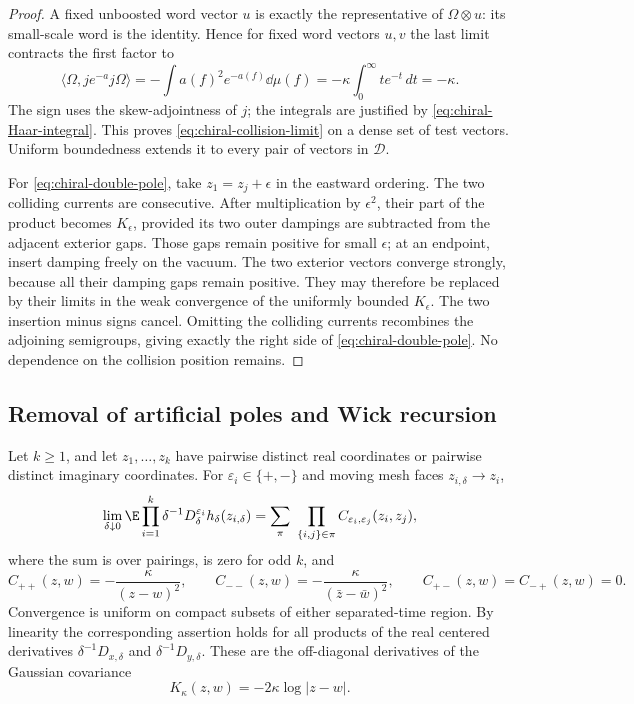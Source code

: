 \begin{proof}
A fixed unboosted word vector $u$ is exactly the representative of
$\Omega\otimes u$: its small-scale word is the identity. Hence for
fixed word vectors $u,v$ the last limit contracts the first factor to
\[
 \langle\Omega,je^{-a}j\Omega\rangle
   =-\int a(f)^2e^{-a(f)}\dd\mu(f)
   =-\kappa\int_0^\infty t e^{-t}\,dt=-\kappa.
\]
The sign uses the skew-adjointness of $j$; the integrals are justified
by \eqref{eq:chiral-Haar-integral}. This proves
\eqref{eq:chiral-collision-limit} on a dense set of test vectors.
Uniform boundedness extends it to every pair of vectors in $\mathcal D$.

For \eqref{eq:chiral-double-pole}, take $z_1=z_j+\epsilon$ in the
eastward ordering. The two colliding currents are consecutive. After
multiplication by $\epsilon^2$, their part of the product becomes
$K_\epsilon$, provided its two outer dampings are subtracted from the
adjacent exterior gaps. Those gaps remain positive for small $\epsilon$;
at an endpoint, insert damping freely on the vacuum. The two exterior
vectors converge strongly, because all their damping gaps remain positive.
They may therefore be replaced by their limits in the weak convergence
of the uniformly bounded $K_\epsilon$. The two insertion minus signs
cancel. Omitting the colliding currents recombines the adjoining
semigroups, giving exactly the right side of
\eqref{eq:chiral-double-pole}. No dependence on the collision position
remains.
\end{proof}

\subsection{Removal of artificial poles and Wick recursion}

\begin{proposition}\label{prop:gaussian-currents}
Let $k\ge1$, and let $z_1,\ldots,z_k$ have pairwise distinct real
coordinates or pairwise distinct imaginary coordinates. For
$\varepsilon_i\in\{+,-\}$ and moving mesh faces $z_{i,\delta}\to z_i$,
\begin{equation}\label{eq:chiral-Gaussian-current-limit}
 \lim_{\delta\downarrow0}
 \E\prod_{i=1}^k
       \delta^{-1}D_\delta^{\varepsilon_i}h_\delta(z_{i,\delta})
   =\sum_{\pi}\ \prod_{\{i,j\}\in\pi}
                  C_{\varepsilon_i,\varepsilon_j}(z_i,z_j),
\end{equation}
where the sum is over pairings, is zero for odd $k$, and
\begin{equation}\label{eq:chiral-contractions}
 C_{++}(z,w)=-\frac{\kappa}{(z-w)^2},\qquad
 C_{--}(z,w)=-\frac{\kappa}{(\bar z-\bar w)^2},\qquad
 C_{+-}(z,w)=C_{-+}(z,w)=0.
\end{equation}
Convergence is uniform on compact subsets of either separated-time
region. By linearity the corresponding assertion holds for all products
of the real centered derivatives $\delta^{-1}D_{x,\delta}$ and
$\delta^{-1}D_{y,\delta}$. These are the off-diagonal derivatives of the
Gaussian covariance
\begin{equation}\label{eq:chiral-log-covariance}
                              K_\kappa(z,w)=-2\kappa\log|z-w|.
\end{equation}
\end{proposition}

